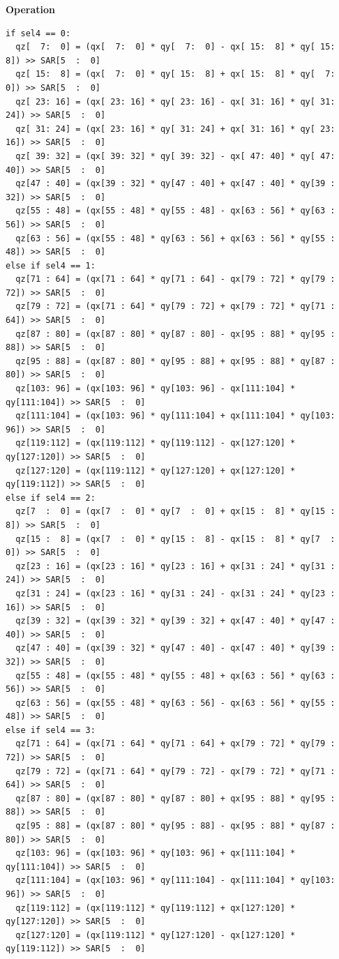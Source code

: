 \textbf{Operation}\\
\begin{lstlisting}
if sel4 == 0:
  qz[  7:  0] = (qx[  7:  0] * qy[  7:  0] - qx[ 15:  8] * qy[ 15:  8]) >> SAR[5  :  0]
  qz[ 15:  8] = (qx[  7:  0] * qy[ 15:  8] + qx[ 15:  8] * qy[  7:  0]) >> SAR[5  :  0]
  qz[ 23: 16] = (qx[ 23: 16] * qy[ 23: 16] - qx[ 31: 16] * qy[ 31: 24]) >> SAR[5  :  0]
  qz[ 31: 24] = (qx[ 23: 16] * qy[ 31: 24] + qx[ 31: 16] * qy[ 23: 16]) >> SAR[5  :  0]
  qz[ 39: 32] = (qx[ 39: 32] * qy[ 39: 32] - qx[ 47: 40] * qy[ 47: 40]) >> SAR[5  :  0]
  qz[47 : 40] = (qx[39 : 32] * qy[47 : 40] + qx[47 : 40] * qy[39 : 32]) >> SAR[5  :  0]
  qz[55 : 48] = (qx[55 : 48] * qy[55 : 48] - qx[63 : 56] * qy[63 : 56]) >> SAR[5  :  0]
  qz[63 : 56] = (qx[55 : 48] * qy[63 : 56] + qx[63 : 56] * qy[55 : 48]) >> SAR[5  :  0]
else if sel4 == 1:
  qz[71 : 64] = (qx[71 : 64] * qy[71 : 64] - qx[79 : 72] * qy[79 : 72]) >> SAR[5  :  0]
  qz[79 : 72] = (qx[71 : 64] * qy[79 : 72] + qx[79 : 72] * qy[71 : 64]) >> SAR[5  :  0]
  qz[87 : 80] = (qx[87 : 80] * qy[87 : 80] - qx[95 : 88] * qy[95 : 88]) >> SAR[5  :  0]
  qz[95 : 88] = (qx[87 : 80] * qy[95 : 88] + qx[95 : 88] * qy[87 : 80]) >> SAR[5  :  0]
  qz[103: 96] = (qx[103: 96] * qy[103: 96] - qx[111:104] * qy[111:104]) >> SAR[5  :  0]
  qz[111:104] = (qx[103: 96] * qy[111:104] + qx[111:104] * qy[103: 96]) >> SAR[5  :  0]
  qz[119:112] = (qx[119:112] * qy[119:112] - qx[127:120] * qy[127:120]) >> SAR[5  :  0]
  qz[127:120] = (qx[119:112] * qy[127:120] + qx[127:120] * qy[119:112]) >> SAR[5  :  0]
else if sel4 == 2:
  qz[7  :  0] = (qx[7  :  0] * qy[7  :  0] + qx[15 :  8] * qy[15 :  8]) >> SAR[5  :  0]
  qz[15 :  8] = (qx[7  :  0] * qy[15 :  8] - qx[15 :  8] * qy[7  :  0]) >> SAR[5  :  0]
  qz[23 : 16] = (qx[23 : 16] * qy[23 : 16] + qx[31 : 24] * qy[31 : 24]) >> SAR[5  :  0]
  qz[31 : 24] = (qx[23 : 16] * qy[31 : 24] - qx[31 : 24] * qy[23 : 16]) >> SAR[5  :  0]
  qz[39 : 32] = (qx[39 : 32] * qy[39 : 32] + qx[47 : 40] * qy[47 : 40]) >> SAR[5  :  0]
  qz[47 : 40] = (qx[39 : 32] * qy[47 : 40] - qx[47 : 40] * qy[39 : 32]) >> SAR[5  :  0]
  qz[55 : 48] = (qx[55 : 48] * qy[55 : 48] + qx[63 : 56] * qy[63 : 56]) >> SAR[5  :  0]
  qz[63 : 56] = (qx[55 : 48] * qy[63 : 56] - qx[63 : 56] * qy[55 : 48]) >> SAR[5  :  0]
else if sel4 == 3:
  qz[71 : 64] = (qx[71 : 64] * qy[71 : 64] + qx[79 : 72] * qy[79 : 72]) >> SAR[5  :  0]
  qz[79 : 72] = (qx[71 : 64] * qy[79 : 72] - qx[79 : 72] * qy[71 : 64]) >> SAR[5  :  0]
  qz[87 : 80] = (qx[87 : 80] * qy[87 : 80] + qx[95 : 88] * qy[95 : 88]) >> SAR[5  :  0]
  qz[95 : 88] = (qx[87 : 80] * qy[95 : 88] - qx[95 : 88] * qy[87 : 80]) >> SAR[5  :  0]
  qz[103: 96] = (qx[103: 96] * qy[103: 96] + qx[111:104] * qy[111:104]) >> SAR[5  :  0]
  qz[111:104] = (qx[103: 96] * qy[111:104] - qx[111:104] * qy[103: 96]) >> SAR[5  :  0]
  qz[119:112] = (qx[119:112] * qy[119:112] + qx[127:120] * qy[127:120]) >> SAR[5  :  0]
  qz[127:120] = (qx[119:112] * qy[127:120] - qx[127:120] * qy[119:112]) >> SAR[5  :  0]

\end{lstlisting}

